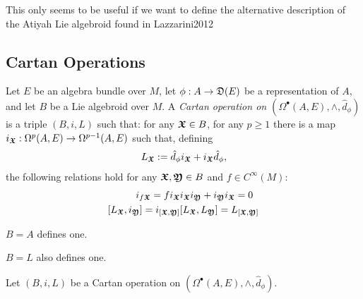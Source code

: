 {\color{gray} This only seems to be useful if we want to define the alternative description of the Atiyah Lie algebroid found in Lazzarini2012

\subsection{Cartan Operations}





\begin{definition}
Let $E$ be an algebra bundle over $M$, let $\phi: A \to \alg D(E)$ be a representation of $A$, and let $B$ be a Lie algebroid over $M$. A \emph{Cartan operation on $(\Omega^\bullet(A, E), \wedge, \hat d_\phi)$} is a triple $(B, i, L)$ such that: for any $\bm{\mathfrak{X}} \in B$, for any $p \geq 1$ there is a map $i_{\bm{\mathfrak{X}}}: \Omega^p(A, E) \to \Omega^{p-1}(A, E)$ such that, defining 
\begin{align}
L_{\sectoid X} := \hat d_\phi i_{\sectoid X} + i_{\sectoid X}\hat d_\phi,
\end{align}
the following relations hold for any $\bm{\mathfrak{X}}, \bm{\mathfrak{Y}} \in B$ and $f \in C^\infty(M)$:
\begin{align}
    i_{f \sectoid X} = f i_{\sectoid X} & i_{\sectoid X} i_{\sectoid Y} + i_{\sectoid Y} i_{\sectoid X} = 0 \\
    [L_{\sectoid X}, i_{\sectoid Y}] = i_{[\sectoid X, \sectoid Y]} & [L_{\sectoid X}, L_{\sectoid Y}] = L_{[\sectoid X, \sectoid Y]}
\end{align}
\end{definition}

\begin{example}
$B = A$ defines one.
\end{example}

\begin{example}
$B = L$ also defines one.
\end{example}

\begin{definition}
Let $(B, i, L)$ be a Cartan operation on $(\Omega^\bullet(A, E), \wedge, \hat d_\phi)$.
    

\end{definition}}
